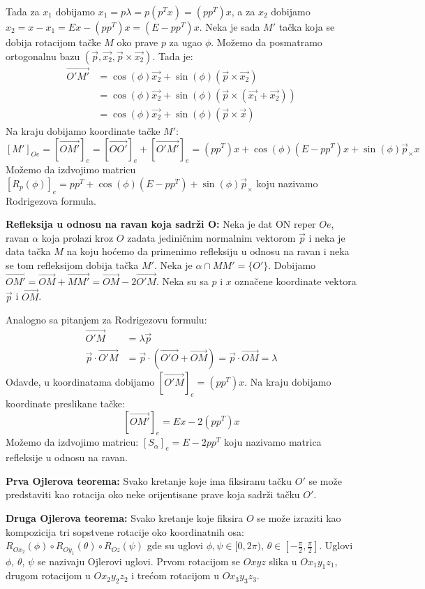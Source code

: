 \documentclass[12pt]{article}
\newcommand{\vek}[1]{\overrightarrow{#1}}
\begin{document}
Tada za $x_1$ dobijamo $x_1=p\lambda=p(p^Tx)=(pp^T)x$, a za $x_2$ dobijamo
$x_2=x-x_1=Ex-(pp^T)x=(E-pp^T)x$. Neka je sada $M'$ tačka koja se dobija
rotacijom tačke $M$ oko prave $p$ za ugao $\phi$. Možemo da posmatramo
ortogonalnu bazu $(\vek{p},\vek{x_2},\vek{p}\times\vek{x_2})$. Tada je:
\begin{align*}
    \vek{O'M'} & =\cos(\phi)\vek{x_2}+\sin(\phi)(\vek{p}\times\vek{x_2})             \\
               & =\cos(\phi)\vek{x_2}+\sin(\phi)(\vek{p}\times(\vek{x_1}+\vek{x_2})) \\
               & =\cos(\phi)\vek{x_2}+\sin(\phi)(\vek{p}\times\vek{x})
\end{align*}
Na kraju dobijamo koordinate tačke $M'$:
$$[M']_{Oe}=[\vek{OM'}]_e=[\vek{OO'}]_e+[\vek{O'M'}]_e=(pp^T)x+\cos(\phi)(E-pp^T)x+\sin(\phi)\vek{p}_\times x$$
Možemo da izdvojimo matricu
$[R_p(\phi)]_e=pp^T+\cos(\phi)(E-pp^T)+\sin(\phi)\vek{p}_\times$
koju nazivamo Rodrigezova formula.
\par

\textbf{Refleksija u odnosu na ravan koja sadrži O:}
\label{refleksija_u_odnosu_na_ravan} Neka je dat ON reper $Oe$,
ravan $\alpha$ koja prolazi kroz $O$ zadata jediničnim normalnim vektorom
$\vek{p}$ i neka je data tačka $M$ na koju hoćemo da primenimo refleksiju u
odnosu na ravan i neka se tom refleksijom dobija tačka $M'$. Neka je
$\alpha\cap MM'=\{O'\}$. Dobijamo
$\vek{OM'}=\vek{OM}+\vek{MM'}=\vek{OM}-2\vek{O'M}$. Neka su sa $p$ i $x$
označene koordinate vektora $\vek{p}$ i $\vek{OM}$.

Analogno sa pitanjem za Rodrigezovu formulu:
\begin{align*}
    \vek{O'M}             & =\lambda\vek{p}                                                \\
    \vek{p}\cdot\vek{O'M} & =\vek{p}\cdot(\vek{O'O}+\vek{OM})=\vek{p}\cdot\vek{OM}=\lambda
\end{align*}
Odavde, u koordinatama dobijamo $[\vek{O'M}]_e=(pp^T)x$. Na kraju dobijamo
koordinate preslikane tačke:
$$[\vek{OM'}]_e=Ex-2(pp^T)x$$
Možemo da izdvojimo matricu: $[S_\alpha]_e=E-2pp^T$ koju nazivamo matrica
refleksije u odnosu na ravan.
\par

\textbf{Prva Ojlerova teorema:} Svako kretanje koje ima fiksiranu tačku
$O'$ se može predstaviti kao rotacija oko neke orijentisane
prave koja sadrži tačku $O'$.
\par

\textbf{Druga Ojlerova teorema:} Svako kretanje koje fiksira $O$ se može
izraziti kao kompozicija tri sopstvene rotacije oko koordinatnih osa:
$R_{Ox_2}(\phi)\circ R_{Oy_1}(\theta)\circ R_{Oz}(\psi)$ gde su uglovi
$\phi,\psi\in[0,2\pi)$, $\theta\in[-\frac{\pi}{2},\frac{\pi}{2}]$. Uglovi $\phi$,
$\theta$, $\psi$ se nazivaju Ojlerovi uglovi. Prvom rotacijom se $Oxyz$ slika u
$Ox_1y_1z_1$, drugom rotacijom u $Ox_2y_2z_2$ i trećom rotacijom u $Ox_3y_3z_3$.
\par
\end{document}
